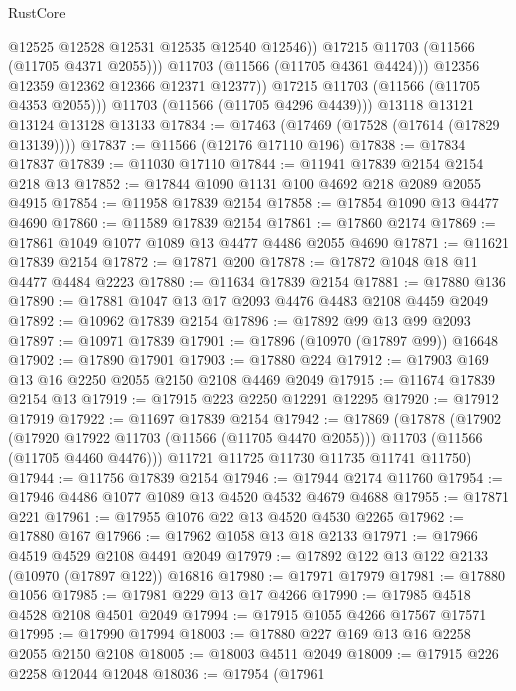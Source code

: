 \begin{lexlean}{RustCore}
\begin{coremodule}
                    @12525
                    @12528
                    @12531
                    @12535
                    @12540
                    @12546))
                @17215
                @11703
                (@11566 (@11705 @4371 @2055)))
              @11703
              (@11566 (@11705 @4361 @4424)))
            @12356
            @12359
            @12362
            @12366
            @12371
            @12377))
        @17215
        @11703
        (@11566 (@11705 @4353 @2055)))
      @11703
      (@11566 (@11705 @4296 @4439)))
    @13118
    @13121
    @13124
    @13128
    @13133
@17834 := @17463 (@17469 (@17528 (@17614 (@17829 @13139))))
@17837 := @11566 (@12176 @17110 @196)
@17838 := @17834 @17837
@17839 := @11030 @17110
@17844 := @11941 @17839 @2154 @2154 @218 @13
@17852 := @17844 @1090 @1131 @100 @4692 @218 @2089 @2055 @4915
@17854 := @11958 @17839 @2154
@17858 := @17854 @1090 @13 @4477 @4690
@17860 := @11589 @17839 @2154
@17861 := @17860 @2174
@17869 := @17861 @1049 @1077 @1089 @13 @4477 @4486 @2055 @4690
@17871 := @11621 @17839 @2154
@17872 := @17871 @200
@17878 := @17872 @1048 @18 @11 @4477 @4484 @2223
@17880 := @11634 @17839 @2154
@17881 := @17880 @136
@17890 := @17881 @1047 @13 @17 @2093 @4476 @4483 @2108 @4459 @2049
@17892 := @10962 @17839 @2154
@17896 := @17892 @99 @13 @99 @2093
@17897 := @10971 @17839
@17901 := @17896 (@10970 (@17897 @99)) @16648
@17902 := @17890 @17901
@17903 := @17880 @224
@17912 := @17903 @169 @13 @16 @2250 @2055 @2150 @2108 @4469 @2049
@17915 := @11674 @17839 @2154 @13
@17919 := @17915 @223 @2250 @12291 @12295
@17920 := @17912 @17919
@17922 := @11697 @17839 @2154
@17942 := @17869
    (@17878
      (@17902
        (@17920 @17922 @11703 (@11566 (@11705 @4470 @2055)))
        @11703
        (@11566 (@11705 @4460 @4476)))
      @11721
      @11725
      @11730
      @11735
      @11741
      @11750)
@17944 := @11756 @17839 @2154
@17946 := @17944 @2174 @11760
@17954 := @17946 @4486 @1077 @1089 @13 @4520 @4532 @4679 @4688
@17955 := @17871 @221
@17961 := @17955 @1076 @22 @13 @4520 @4530 @2265
@17962 := @17880 @167
@17966 := @17962 @1058 @13 @18 @2133
@17971 := @17966 @4519 @4529 @2108 @4491 @2049
@17979 := @17892 @122 @13 @122 @2133 (@10970 (@17897 @122)) @16816
@17980 := @17971 @17979
@17981 := @17880 @1056
@17985 := @17981 @229 @13 @17 @4266
@17990 := @17985 @4518 @4528 @2108 @4501 @2049
@17994 := @17915 @1055 @4266 @17567 @17571
@17995 := @17990 @17994
@18003 := @17880 @227 @169 @13 @16 @2258 @2055 @2150 @2108
@18005 := @18003 @4511 @2049
@18009 := @17915 @226 @2258 @12044 @12048
@18036 := @17954
    (@17961

\end{coremodule}
\end{lexlean}
